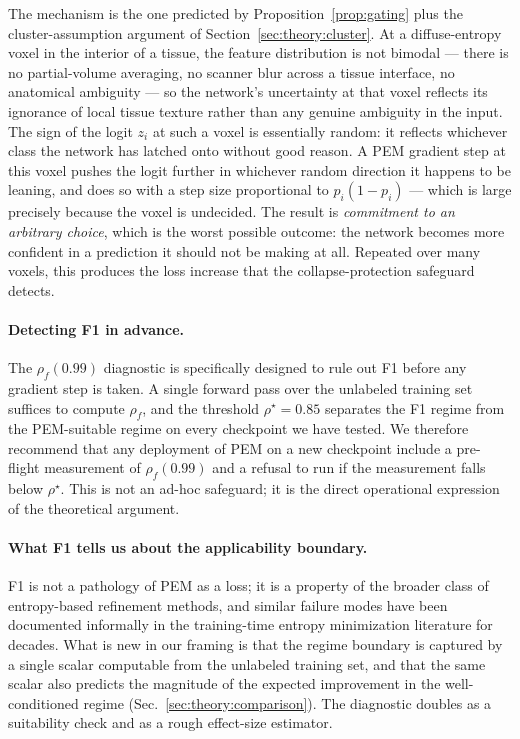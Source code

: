 The mechanism is the one predicted by Proposition~\ref{prop:gating} plus the cluster-assumption argument of Section~\ref{sec:theory:cluster}. At a diffuse-entropy voxel in the interior of a tissue, the feature distribution is not bimodal --- there is no partial-volume averaging, no scanner blur across a tissue interface, no anatomical ambiguity --- so the network's uncertainty at that voxel reflects its ignorance of local tissue texture rather than any genuine ambiguity in the input. The sign of the logit $z_i$ at such a voxel is essentially random: it reflects whichever class the network has latched onto without good reason. A PEM gradient step at this voxel pushes the logit further in whichever random direction it happens to be leaning, and does so with a step size proportional to $p_i(1{-}p_i)$ --- which is large precisely because the voxel is undecided. The result is \emph{commitment to an arbitrary choice}, which is the worst possible outcome: the network becomes more confident in a prediction it should not be making at all. Repeated over many voxels, this produces the loss increase that the collapse-protection safeguard detects.

\paragraph{Detecting F1 in advance.}
The $\rho_f(0.99)$ diagnostic is specifically designed to rule out F1 before any gradient step is taken. A single forward pass over the unlabeled training set suffices to compute $\rho_f$, and the threshold $\rho^\star\!=\!0.85$ separates the F1 regime from the PEM-suitable regime on every checkpoint we have tested. We therefore recommend that any deployment of PEM on a new checkpoint include a pre-flight measurement of $\rho_f(0.99)$ and a refusal to run if the measurement falls below $\rho^\star$. This is not an ad-hoc safeguard; it is the direct operational expression of the theoretical argument.

\paragraph{What F1 tells us about the applicability boundary.}
F1 is not a pathology of PEM as a loss; it is a property of the broader class of entropy-based refinement methods, and similar failure modes have been documented informally in the training-time entropy minimization literature for decades. What is new in our framing is that the regime boundary is captured by a single scalar computable from the unlabeled training set, and that the same scalar also predicts the magnitude of the expected improvement in the well-conditioned regime (Sec.~\ref{sec:theory:comparison}). The diagnostic doubles as a suitability check and as a rough effect-size estimator.

